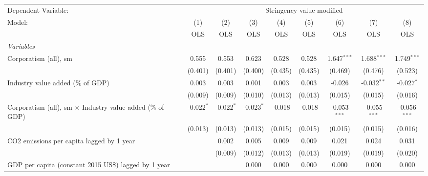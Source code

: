
\begingroup
\centering
\begin{tabular}{lcccccccc}
   \toprule
   Dependent Variable: & \multicolumn{8}{c}{Stringency value modified}\\
   Model:                                                            & (1)          & (2)          & (3)          & (4)     & (5)     & (6)            & (7)            & (8)\\  
                                                                     &  OLS         & OLS          & OLS          & OLS     & OLS     & OLS            & OLS            & OLS\\  
   \midrule
   \emph{Variables}\\
   Corporatism (all), sm                                             & 0.555        & 0.553        & 0.623        & 0.528   & 0.528   & 1.647$^{***}$  & 1.688$^{***}$  & 1.749$^{***}$\\   
                                                                     & (0.401)      & (0.401)      & (0.400)      & (0.435) & (0.435) & (0.469)        & (0.476)        & (0.523)\\   
   Industry value added (\% of GDP)                                  & 0.003        & 0.003        & 0.001        & 0.003   & 0.003   & -0.026         & -0.032$^{**}$  & -0.027$^{*}$\\   
                                                                     & (0.009)      & (0.009)      & (0.010)      & (0.013) & (0.013) & (0.015)        & (0.015)        & (0.016)\\   
   Corporatism (all), sm $\times$ Industry value added (\% of GDP)   & -0.022$^{*}$ & -0.022$^{*}$ & -0.023$^{*}$ & -0.018  & -0.018  & -0.053$^{***}$ & -0.055$^{***}$ & -0.056$^{***}$\\   
                                                                     & (0.013)      & (0.013)      & (0.013)      & (0.015) & (0.015) & (0.015)        & (0.015)        & (0.016)\\   
   CO2 emissions per capita lagged by 1 year                         &              & 0.002        & 0.005        & 0.009   & 0.009   & 0.021          & 0.024          & 0.031\\   
                                                                     &              & (0.009)      & (0.012)      & (0.013) & (0.013) & (0.019)        & (0.019)        & (0.020)\\   
   GDP per capita (constant 2015 US\$) lagged by 1 year              &              &              & 0.000        & 0.000   & 0.000   & 0.000          & 0.000          & 0.000\\   

\end{tabular}
